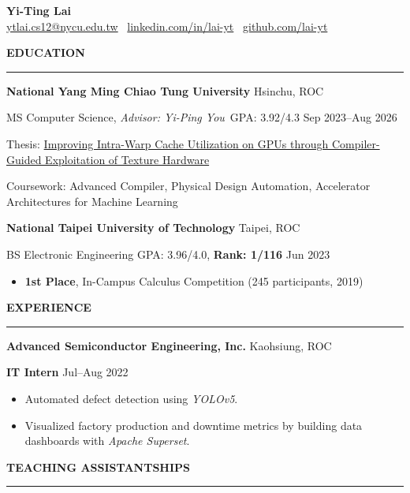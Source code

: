 \documentclass[11pt]{article}
\newcommand{\resumesection}[1]{%
    \vspace{8pt}
    \noindent\textbf{\large #1}\par
    \vspace{4pt}
    \hrule
    \vspace{6pt}
}
\begin{document}
\begin{center}
    \textbf{\Large Yi-Ting Lai}\\
    \href{mailto:ytlai.cs12@nycu.edu.tw}{ytlai.cs12@nycu.edu.tw} \textbullet \ \href{https://www.linkedin.com/in/lai-yt}{linkedin.com/in/lai-yt} \textbullet \ \href{https://github.com/lai-yt}{github.com/lai-yt}
\end{center}

\vspace{-10pt}

\resumesection{EDUCATION}

\textbf{National Yang Ming Chiao Tung University} \hfill Hsinchu, ROC

MS Computer Science, \textit{Advisor: Yi-Ping You} \,\qquad GPA: 3.92/4.3 \hfill Sep 2023--Aug 2026

Thesis: \href{https://lai-yt.github.io/assets/files/yi-ting-lai-master-thesis.pdf}{Improving Intra-Warp Cache Utilization on GPUs through Compiler-Guided Exploitation of Texture Hardware}

Coursework: Advanced Compiler, Physical Design Automation, Accelerator Architectures for Machine Learning

\vspace{6pt}

\textbf{National Taipei University of Technology} \hfill Taipei, ROC

BS Electronic Engineering \enskip \qquad \qquad \qquad \qquad \qquad GPA: 3.96/4.0, \textbf{Rank: 1/116} \hfill Jun 2023
\begin{itemize}[noitemsep, topsep=0pt, partopsep=0pt, parsep=0pt, leftmargin=*]
    \item \textbf{1st Place}, In-Campus Calculus Competition (245 participants, 2019)
\end{itemize}

\resumesection{EXPERIENCE}

\textbf{Advanced Semiconductor Engineering, Inc.} \hfill Kaohsiung, ROC

\textbf{IT Intern} \hfill Jul--Aug 2022
\begin{itemize}[noitemsep, topsep=0pt, partopsep=0pt, parsep=0pt, leftmargin=*]
    \item Automated defect detection using \textit{YOLOv5}.
    \item Visualized factory production and downtime metrics by building data dashboards with \textit{Apache Superset}.
\end{itemize}

\resumesection{TEACHING ASSISTANTSHIPS}
\end{document}
